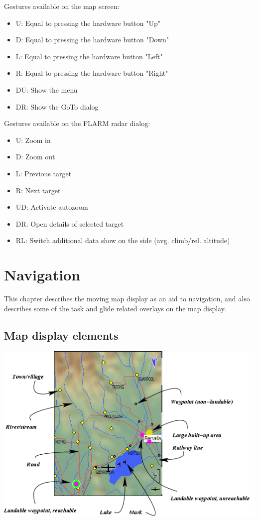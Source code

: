 \documentclass[a4paper,12pt]{refrep}
\begin{document}
  Gestures available on the map screen:
\begin{itemize}
\item U: Equal to pressing the hardware button "Up"
\item D: Equal to pressing the hardware button "Down"
\item L: Equal to pressing the hardware button "Left"
\item R: Equal to pressing the hardware button "Right"
\item DU: Show the menu
\item DR: Show the GoTo dialog
\end{itemize}


  Gestures available on the FLARM radar dialog:
\begin{itemize}
\item U: Zoom in
\item D: Zoom out
\item L: Previous target
\item R: Next target
\item UD: Activate autozoom
\item DR: Open details of selected target
\item RL: Switch additional data show on the side (avg. climb/rel. altitude)
\end{itemize}

\chapter{Navigation}\label{cha:navigation}
This chapter describes the moving map display as an aid to navigation,
and also describes some of the task and glide related overlays on the
map display.

\section{Map display elements}

\begin{maxipage}
\includegraphics[angle=0,width=0.9\linewidth,keepaspectratio='true']{figures/fig-map.png}
\end{maxipage}
\end{document}
